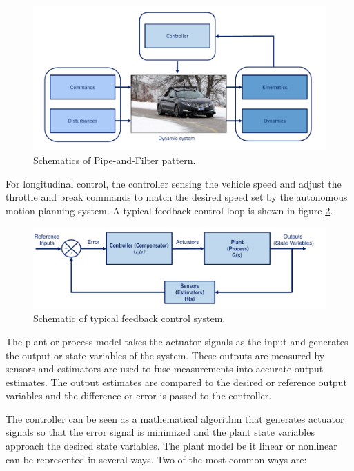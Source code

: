 \begin{figure}[!htb]
\begin{center}
\includegraphics[scale=0.380]{img/longitudinal_control/dynamic_system.jpeg}
\end{center}
\caption{Schematics of Pipe-and-Filter pattern.}
\label{dynamic_system}
\end{figure}

For longitudinal control, the controller sensing the vehicle speed and adjust the throttle and break 
commands to match the desired speed set by the autonomous motion planning system. A typical feedback control loop is shown in figure \ref{feednack_control}. 

\begin{figure}[!htb]
\begin{center}
\includegraphics[scale=0.380]{img/longitudinal_control/feednack_control.jpeg}
\end{center}
\caption{Schematic of typical feedback control system.}
\label{feednack_control}
\end{figure}

The plant or process model takes the actuator signals as the input and generates the output or state variables of the system. These outputs are measured by sensors and estimators are used to fuse measurements into accurate output estimates. The output estimates are compared to the desired or reference output variables and the difference 
or error is passed to the controller. 

The controller can be seen as a mathematical algorithm that generates actuator signals so that the error signal is minimized and the plant 
state variables approach the desired state variables. 
The plant model be it linear or nonlinear can be represented in several ways. 
Two of the most common ways are:

